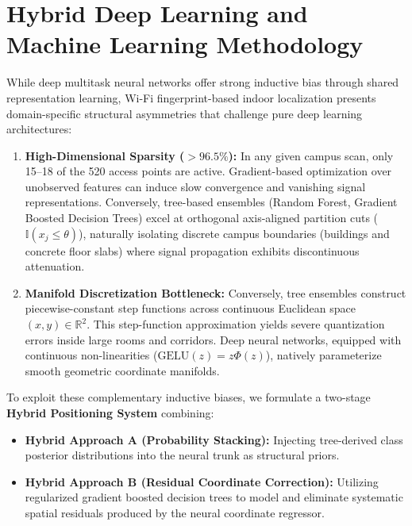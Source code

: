 
\section{Hybrid Deep Learning and Machine Learning Methodology}
\label{sec:hybrid-methodology}

While deep multitask neural networks offer strong inductive bias through shared representation learning, Wi-Fi fingerprint-based indoor localization presents domain-specific structural asymmetries that challenge pure deep learning architectures:
\begin{enumerate}
    \item \textbf{High-Dimensional Sparsity ($>96.5\%$):} In any given campus scan, only 15--18 of the 520 access points are active. Gradient-based optimization over unobserved features can induce slow convergence and vanishing signal representations. Conversely, tree-based ensembles (Random Forest, Gradient Boosted Decision Trees) excel at orthogonal axis-aligned partition cuts ($\mathbb{I}(x_j \le \theta)$), naturally isolating discrete campus boundaries (buildings and concrete floor slabs) where signal propagation exhibits discontinuous attenuation.
    \item \textbf{Manifold Discretization Bottleneck:} Conversely, tree ensembles construct piecewise-constant step functions across continuous Euclidean space $(x, y) \in \mathbb{R}^2$. This step-function approximation yields severe quantization errors inside large rooms and corridors. Deep neural networks, equipped with continuous non-linearities ($\text{GELU}(z) = z \Phi(z)$), natively parameterize smooth geometric coordinate manifolds.
\end{enumerate}

To exploit these complementary inductive biases, we formulate a two-stage \textbf{Hybrid Positioning System} combining:
\begin{itemize}
    \item \textbf{Hybrid Approach A (Probability Stacking):} Injecting tree-derived class posterior distributions into the neural trunk as structural priors.
    \item \textbf{Hybrid Approach B (Residual Coordinate Correction):} Utilizing regularized gradient boosted decision trees to model and eliminate systematic spatial residuals produced by the neural coordinate regressor.
\end{itemize}

